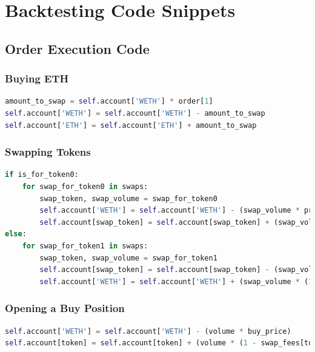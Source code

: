 \section{Backtesting Code Snippets}

\subsection{Order Execution Code}
\label{sec:backtesting-execution-code}

\subsubsection{Buying ETH}
\begin{lstlisting}[language=Python, caption={Execution code for Buying ETH},captionpos=b]
amount_to_swap = self.account['WETH'] * order[1]
self.account['WETH'] = self.account['WETH'] - amount_to_swap
self.account['ETH'] = self.account['ETH'] + amount_to_swap
\end{lstlisting}

\subsubsection{Swapping Tokens}
\begin{lstlisting}[language=Python, caption={Execution code for Swapping Tokens on a specified liquidity pool},captionpos=b]
if is_for_token0:
    for swap_for_token0 in swaps:
        swap_token, swap_volume = swap_for_token0
        self.account['WETH'] = self.account['WETH'] - (swap_volume * prices[f'P{swap_token[1]}'])
        self.account[swap_token] = self.account[swap_token] + (swap_volume * (1 - swap_fees[swap_token]))
else:
    for swap_for_token1 in swaps:
        swap_token, swap_volume = swap_for_token1
        self.account[swap_token] = self.account[swap_token] - (swap_volume / prices[f'P{swap_token[1]}'])
        self.account['WETH'] = self.account['WETH'] + (swap_volume * (1 - swap_fees[swap_token]))
\end{lstlisting}

\subsubsection{Opening a Buy Position}
\begin{lstlisting}[language=Python, caption={Execution code for opening a buy positon},captionpos=b]
self.account['WETH'] = self.account['WETH'] - (volume * buy_price)
self.account[token] = self.account[token] + (volume * (1 - swap_fees[token]))
\end{lstlisting}

